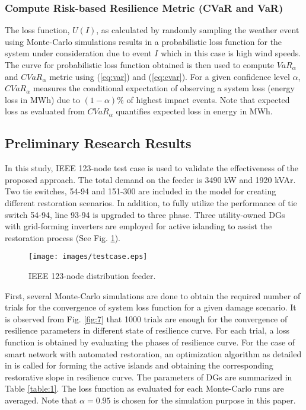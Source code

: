 \documentclass[12pt]{article}
\begin{document}
\subsubsection{Compute Risk-based Resilience Metric (CVaR and VaR)}
The loss function, $U(I)$, as calculated by randomly sampling the weather event using Monte-Carlo simulations results in a probabilistic loss function for the system under consideration due to event $I$ which in this case is high wind speeds. The curve for probabilistic loss function obtained is then used to compute $VaR_\alpha$ and $CVaR_\alpha$ metric using (\ref{eq:var}) and (\ref{eq:cvar}). For a given confidence level $\alpha$, $CVaR_\alpha$ measures the conditional expectation of observing a system loss (energy loss in MWh) due to $(1-\alpha)\%$ of highest impact events. Note that expected loss as evaluated from $CVaR_\alpha$ quantifies expected loss in energy in MWh.

\subsection{Preliminary Research Results}

In this study, IEEE 123-node test case is used to validate the effectiveness of the proposed approach. The total demand on the feeder is 3490 kW and 1920 kVAr. 
Two tie switches, 54-94 and 151-300 are included in the model for creating different restoration scenarios. In addition, to fully utilize the performance of tie switch 54-94, line 93-94 is upgraded to three phase. Three utility-owned DGs with grid-forming inverters are employed for active islanding to assist the restoration process (See Fig. \ref{fig:6}).

\begin{figure}[h]
    \centering
    \texttt{[image: images/testcase.eps]}
    \vspace{-0.3 cm}
    \caption{IEEE 123-node distribution feeder.}
    \label{fig:6}
    \vspace{-0.4 cm}
\end{figure}

 First, several Monte-Carlo simulations are done to obtain the required number of trials for the convergence of system loss function for a given damage scenario. It is observed from Fig. \ref{fig:7} that 1000 trials are enough for the convergence of resilience parameters in different state of resilience curve. For each trial, a loss function is obtained by evaluating the phases of resilience curve. For the case of smart network with automated restoration, an optimization algorithm as detailed in \cite{8421054} is called for forming the active islands and obtaining the corresponding restorative slope in resilience curve. The parameters of DGs are summarized in Table \ref{table:1}. The loss function as evaluated for each Monte-Carlo runs are averaged. Note that $\alpha = 0.95$ is chosen for the simulation purpose in this paper.
 
\end{document}
